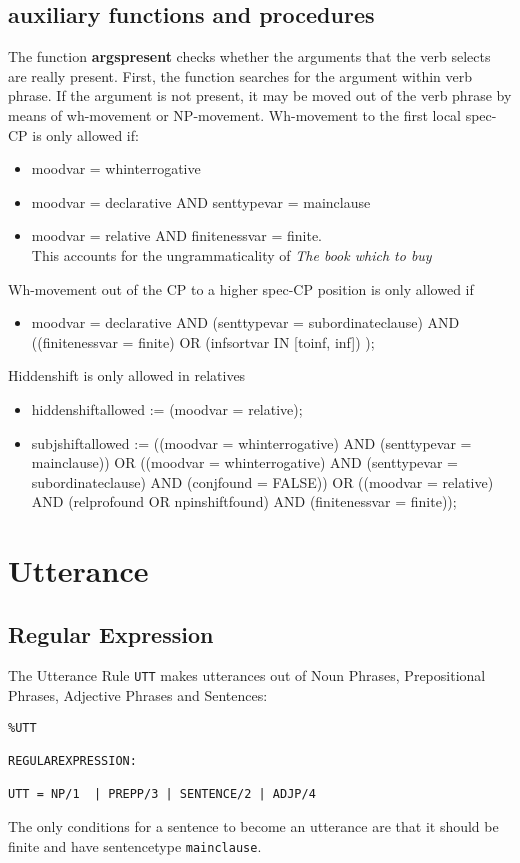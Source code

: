 \subsection{auxiliary functions and procedures}
The function {\bf argspresent} checks whether the arguments that the verb 
selects are really present. First, the function searches for the argument 
within verb phrase. If the argument is not present, it may be moved out of the 
verb phrase by means of wh-movement or NP-movement. Wh-movement to the first 
local spec-CP is only allowed 
if:
\begin{itemize}
\item moodvar = whinterrogative 
\item moodvar = declarative AND senttypevar = mainclause
\item moodvar = relative AND finitenessvar = finite.\\
This accounts for the ungrammaticality of {\em *The book which to buy}
\end{itemize}      
Wh-movement out of the CP to a higher spec-CP position is only allowed if 
\begin{itemize}
  \item moodvar = declarative AND
                      (senttypevar = subordinateclause) AND
                      ((finitenessvar = finite) OR
                       (infsortvar IN [toinf, inf])
                      );
\end{itemize}
Hiddenshift is only allowed in relatives
\begin{itemize}
\item  hiddenshiftallowed := (moodvar = relative);

\item  subjshiftallowed := ((moodvar = whinterrogative) AND
                       (senttypevar = mainclause))             OR
                      ((moodvar = whinterrogative) AND
                       (senttypevar = subordinateclause) AND
                       (conjfound = FALSE))                    OR
                      ((moodvar = relative) AND 
                       (relprofound OR npinshiftfound)   AND
                       (finitenessvar = finite));

\end{itemize}
\section{Utterance}
\subsection{Regular Expression}
The Utterance Rule {\tt UTT} makes utterances out of Noun Phrases, 
Prepositional Phrases, Adjective Phrases and Sentences:
\begin{verbatim}
%UTT

REGULAREXPRESSION:

UTT = NP/1  | PREPP/3 | SENTENCE/2 | ADJP/4
\end{verbatim}
The only conditions for a sentence to become an utterance are that it should be 
finite and have sentencetype {\tt mainclause}.

